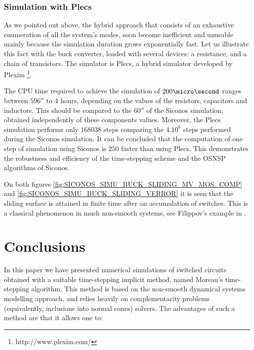 \subsubsection{Simulation with {\sc Plecs}}

As we pointed out above, the hybrid approach that consists of an exhaustive enumeration of all the
system's modes, soon become inefficient and unusable mainly because the simulation duration grows
exponentially fast. Let us illustrate this fact with the buck converter, loaded with several
devices: a resistance, and a chain of transistors. The simulator is {\sc Plecs}, a hybrid simulator developed by Plexim \footnote{http://www.plexim.com/}. 

The CPU time required to achieve the simulation of $200 \micro\second$ ranges between $596 \second$ to $4$ hours,
depending on the values of the resistors, capacitors and inductors. This should be compared to the
$60\second$ of the {\sc Siconos} simulation, obtained independently of these components values.
Moreover, the {\sc Plecs} simulation performs only $168038$ steps comparing the $4.10^{6}$ steps performed during the {\sc Siconos}
simulation. It can be concluded that the computation of one step of simulation using {\sc Siconos} is $250$
faster than using {\sc Plecs}. This demonstrates the robustness and efficiency of the time-stepping scheme
and the OSNSP algorithms of {\sc Siconos}.

\begin{remark}
  On both figures \ref{fig:SICONOS_SIMU_BUCK_SLIDING_MV_MOS_COMP} and
  \ref{fig:SICONOS_SIMU_BUCK_SLIDING_VERROR} it is seen that the sliding surface is attained in
  finite time after an accumulation of switches. This is a classical phenomenon in much non-smooth
  systems, see Filippov's example in \cite{Acary.Brogliato2009}.
\end{remark}
\section{Conclusions}
\label{section5}


In this paper we have presented numerical simulations of switched circuits obtained with a suitable time-stepping implicit method, named Moreau's time-stepping algorithm. This method is based on the non-smooth dynamical systems modelling approach, and relies heavily on complementarity problems (equivalently, inclusions into normal cones) solvers. The advantages of such a method are that it allows one to:

